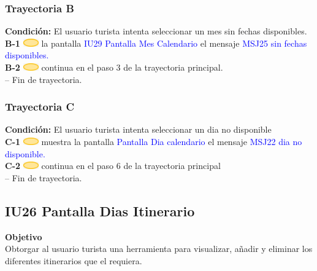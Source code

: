 \subsubsection{\textbf{Trayectoria B}}
\textbf{Condición:} El usuario turista intenta seleccionar un mes sin fechas disponibles.\\
\textbf{B-1} \includegraphics[width=0.0500\textwidth]{Figuras/sistema.png} la pantalla \textcolor{blue}{IU29 Pantalla Mes Calendario} el mensaje \textcolor{blue}{MSJ25 sin fechas disponibles.} \\
\textbf{B-2} \includegraphics[width=0.0500\textwidth]{Figuras/sistema.png} continua en el paso 3 de la trayectoria principal.\\
-- Fin de trayectoria.\par

\subsubsection{\textbf{Trayectoria C}}
\textbf{Condición:} El usuario turista intenta seleccionar un dia no disponible\\

\textbf{C-1} \includegraphics[width=0.0500\textwidth]{Figuras/sistema.png} muestra la pantalla \textcolor{blue}{Pantalla Dia calendario} el mensaje \textcolor{blue}{MSJ22 dia no disponible.} \\
\textbf{C-2} \includegraphics[width=0.0500\textwidth]{Figuras/sistema.png} continua en el paso 6 de la trayectoria principal\\
-- Fin de trayectoria.\par

\subsection{\textbf{IU26 Pantalla Dias Itinerario}}
\textbf{Objetivo}\\
Obtorgar al usuario turista una herramienta para visualizar, añadir y eliminar los diferentes itinerarios que el requiera.\\

